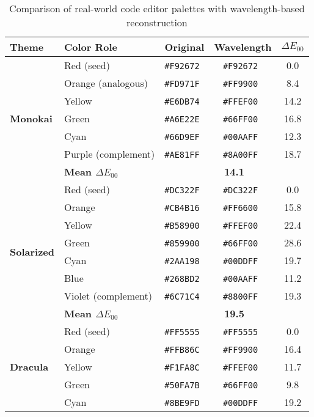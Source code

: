 \documentclass[12pt,a4paper]{article}
\newcommand{\deltaE}{\Delta E_{00}}
\newcommand{\hexcolour}[1]{%
  \definecolor{tempcolour}{HTML}{#1}%
  \texttt{\##1}~\raisebox{0.2ex}{\fboxsep=0pt\fbox{\colorbox{tempcolour}{\phantom{XX}}}}%
}
\begin{document}
\begin{table}[H]
\centering
\caption{Comparison of real-world code editor palettes with wavelength-based reconstruction}
\label{tab:editor-palettes}
\small
\begin{tabular}{llccc}
\toprule
\textbf{Theme} & \textbf{Color Role} & \textbf{Original} & \textbf{Wavelength} & \textbf{$\deltaE$} \\
\midrule
\multirow{7}{*}{\textbf{Monokai}} 
& Red (seed) & \hexcolour{F92672} & \hexcolour{F92672} & 0.0 \\
& Orange (analogous) & \hexcolour{FD971F} & \hexcolour{FF9900} & 8.4 \\
& Yellow & \hexcolour{E6DB74} & \hexcolour{FFEF00} & 14.2 \\
& Green & \hexcolour{A6E22E} & \hexcolour{66FF00} & 16.8 \\
& Cyan & \hexcolour{66D9EF} & \hexcolour{00AAFF} & 12.3 \\
& Purple (complement) & \hexcolour{AE81FF} & \hexcolour{8A00FF} & 18.7 \\
\cmidrule{2-5}
& \textbf{Mean $\deltaE$} & \multicolumn{3}{c}{\textbf{14.1}} \\
\midrule
\multirow{8}{*}{\textbf{Solarized}} 
& Red (seed) & \hexcolour{DC322F} & \hexcolour{DC322F} & 0.0 \\
& Orange & \hexcolour{CB4B16} & \hexcolour{FF6600} & 15.8 \\
& Yellow & \hexcolour{B58900} & \hexcolour{FFEF00} & 22.4 \\
& Green & \hexcolour{859900} & \hexcolour{66FF00} & 28.6 \\
& Cyan & \hexcolour{2AA198} & \hexcolour{00DDFF} & 19.7 \\
& Blue & \hexcolour{268BD2} & \hexcolour{00AAFF} & 11.2 \\
& Violet (complement) & \hexcolour{6C71C4} & \hexcolour{8800FF} & 19.3 \\
\cmidrule{2-5}
& \textbf{Mean $\deltaE$} & \multicolumn{3}{c}{\textbf{19.5}} \\
\midrule
\multirow{7}{*}{\textbf{Dracula}} 
& Red (seed) & \hexcolour{FF5555} & \hexcolour{FF5555} & 0.0 \\
& Orange & \hexcolour{FFB86C} & \hexcolour{FF9900} & 16.4 \\
& Yellow & \hexcolour{F1FA8C} & \hexcolour{FFEF00} & 11.7 \\
& Green & \hexcolour{50FA7B} & \hexcolour{66FF00} & 9.8 \\
& Cyan & \hexcolour{8BE9FD} & \hexcolour{00DDFF} & 19.2 \\

\end{tabular}
\end{table}
\end{document}
